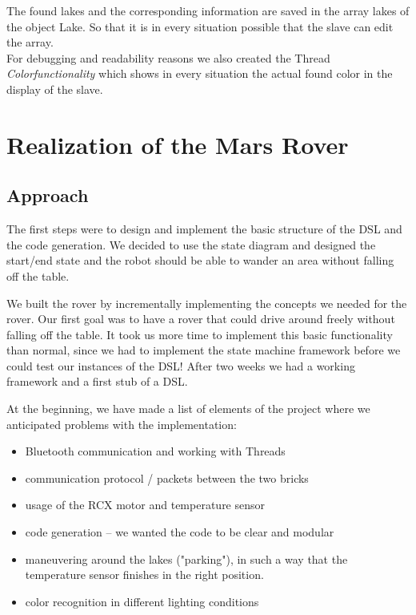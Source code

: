 \documentclass[11pt,a4paper]{article}
\begin{document}
The found lakes and the corresponding information are saved in the array lakes of the object Lake. So that it is in every situation possible that the slave can edit the array. \\

For debugging and readability reasons we also created the Thread \emph{Colorfunctionality} which shows in every situation the actual found color in the display of the slave.  
  



\section{Realization of the Mars Rover}
\subsection{Approach}
The first steps were to design and implement the basic structure of the DSL and the code generation. We decided to use the state diagram and designed the start/end state and the robot should be able to wander an area without falling off the table. 

We built the rover by incrementally implementing the concepts we needed for the rover. Our first goal was to have a rover that could drive around freely without falling off the table. It took us more time to implement this basic functionality than normal, since we had to implement the state machine framework before we could test our instances of the DSL!
After two weeks we had a working framework and a first stub of a DSL. 

At the beginning, we have made a list of elements of the project where we anticipated problems with the implementation: 
\begin{itemize}
\item Bluetooth communication and working with Threads
\item communication protocol / packets between the two bricks
\item usage of the RCX motor and temperature sensor
\item code generation -- we wanted the code to be clear and modular
\item maneuvering around the lakes ("parking"), in such a way that the temperature sensor finishes in the right position.
\item color recognition in different lighting conditions
\end{itemize}
\end{document}

